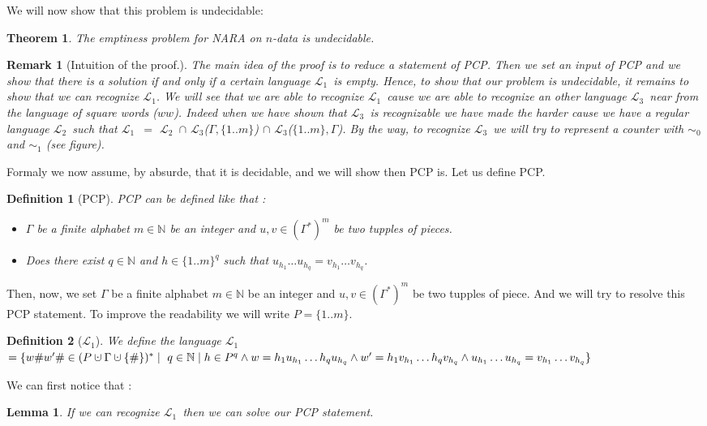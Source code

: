 \documentclass[a4paper,10pt]{report}
\newtheorem{thr}{Theorem} %
\newtheorem{lm}{Lemma}[thr]
\newtheorem{df}{Definition}
\newtheorem{rk}{Remark}
\newcommand{\Lu}{$\mathcal{L}_{1}$}
\newcommand{\Ld}{$\mathcal{L}_{2}$}
\newcommand{\Lt}{$\mathcal{L}_{3}$}
\newcommand{\sm}{\{1..m\}}
\newcommand{\cupdot}{\mathbin{\mathaccent\cdot\cup}}
\begin{document}
  We will now show that  this problem is undecidable:
  \begin{thr}
    The emptiness problem for \textit{NARA} on $n$-data is undecidable.
  \end{thr}
  \begin{rk}[Intuition of the proof.]
  The main idea of the proof is to reduce a statement of PCP. 
  Then we set an input of PCP and we show that there is a solution if and only if a certain language \Lu\ is empty.
  Hence, to show that our problem is undecidable, it remains to show that we can recognize \Lu.
  We will see that we are able to recognize \Lu\ cause we are able to recognize an other language \Lt\ near from the language of square words ($ww$).
  Indeed when we have shown that \Lt\ is recognizable we have made the harder cause we have a regular language \Ld\ such that  \Lu\ $=$ \Ld\ $\cap$ \Lt($\Gamma,\sm$) $\cap$ \Lt($\sm
  ,\Gamma$). 
  By the way, to recognize \Lt\ we will try to represent a counter with $\sim_0$ and $\sim_1$ (see figure).   
  \end{rk}
  Formaly we now assume, by absurde,  that it is decidable, and we will show then PCP is. 
  Let us define PCP.
  \begin{df}[PCP] PCP can be defined like that :
    \begin{itemize}
     \item[Input:] $\Gamma$ be a finite alphabet $m \in \mathbb N$ be an integer and $u,v \in {(\Gamma^*)}^m$ be two tupples of pieces.
     \item[Question:] Does there exist $q \in \mathbb N$ and $h \in {\sm} ^ q$ such that $u_{h_1} \ldots u_{h_q}  = v_{h_1}\ldots v_{h_q}$.
    \end{itemize}
  \end{df}
    Then, now, we set  $\Gamma$ be a finite alphabet $m \in \mathbb N$ be an integer and  $u,v \in {(\Gamma^*)}^m$ be two tupples of piece.
    And we will try to resolve this PCP statement.
    To improve the readability we will write $P = \sm$. 
  \begin{df}[\Lu] 
    We define the language \Lu $= \{w\#w'\# \in (P \cupdot \Gamma \cupdot \{\# \})^*  \mid \\\    
     q \in \mathbb N
    \mid h \in P ^ q
    \wedge w = h_1u_{h_1}\ldots h_qu_{h_q}  
    \wedge w' = h_1v_{h_1}\ldots h_qv_{h_q}
    \wedge u_{h_1}\ldots u_{h_q}  = v_{h_1}\ldots v_{h_q}
    \}$
  \end{df}
  We can first notice that :
  \begin{lm}
      If we can recognize \Lu\ then we can solve our PCP statement. 
  \end{lm}
\end{document}
